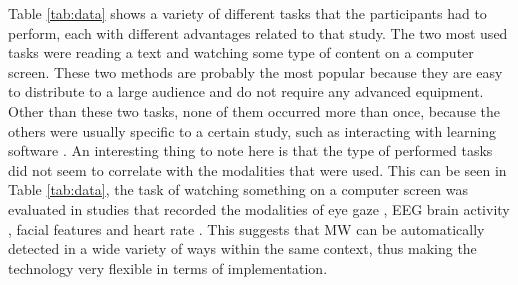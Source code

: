 Table \ref{tab:data} shows a variety of different tasks that the participants had to perform, each with different advantages related to that study. The two most used tasks were reading a text and watching some type of content on a computer screen. These two methods are probably the most popular because they are easy to distribute to a large audience and do not require any advanced equipment. Other than these two tasks, none of them occurred more than once, because the others were usually specific to a certain study, such as interacting with learning software \cite{Hutt2017OutClassroom}. An interesting thing to note here is that the type of performed tasks did not seem to correlate with the modalities that were used. This can be seen in Table \ref{tab:data}, the task of watching something on a computer screen was evaluated in studies that recorded the modalities of eye gaze \cite{Zhao2017ScalableApproach}, EEG brain activity \cite{Russell2016MonitoringEnvironments}, facial features \cite{Stewart2017FaceComprehension} and heart rate \cite{Pham2015Attentivelearner:Tracking}. This suggests that MW can be automatically detected in a wide variety of ways within the same context, thus making the technology very flexible in terms of implementation.